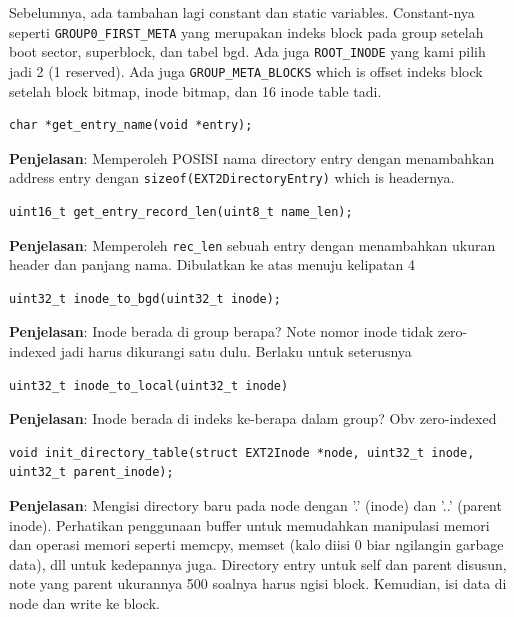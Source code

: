 Sebelumnya, ada tambahan lagi constant dan static variables. Constant-nya seperti \texttt{GROUP0\_FIRST\_META} yang merupakan indeks block pada group setelah boot sector, superblock, dan tabel bgd. Ada juga \texttt{ROOT\_INODE} yang kami pilih jadi 2 (1 reserved). Ada juga \texttt{GROUP\_META\_BLOCKS} which is offset indeks block setelah block bitmap, inode bitmap, dan 16 inode table tadi.

\begin{lstlisting}
char *get_entry_name(void *entry);
\end{lstlisting}

\textbf{Penjelasan}: Memperoleh POSISI nama directory entry dengan menambahkan address entry dengan \texttt{sizeof(EXT2DirectoryEntry)} which is headernya.

\begin{lstlisting}
uint16_t get_entry_record_len(uint8_t name_len);
\end{lstlisting}

\textbf{Penjelasan}: Memperoleh \texttt{rec\_len} sebuah entry dengan menambahkan ukuran header dan panjang nama. Dibulatkan ke atas menuju kelipatan 4

\begin{lstlisting}
uint32_t inode_to_bgd(uint32_t inode);
\end{lstlisting}

\textbf{Penjelasan}: Inode berada di group berapa? Note nomor inode tidak zero-indexed jadi harus dikurangi satu dulu. Berlaku untuk seterusnya

\begin{lstlisting}
uint32_t inode_to_local(uint32_t inode)
\end{lstlisting}

\textbf{Penjelasan}: Inode berada di indeks ke-berapa dalam group? Obv zero-indexed

\begin{lstlisting}
void init_directory_table(struct EXT2Inode *node, uint32_t inode, uint32_t parent_inode);
\end{lstlisting}

\textbf{Penjelasan}: Mengisi directory baru pada node dengan '.' (inode) dan '..' (parent inode). Perhatikan penggunaan buffer untuk memudahkan manipulasi memori dan operasi memori seperti memcpy, memset (kalo diisi 0 biar ngilangin garbage data), dll untuk kedepannya juga. Directory entry untuk self dan parent disusun, note yang parent ukurannya 500 soalnya harus ngisi block. Kemudian, isi data di node dan write ke block.

